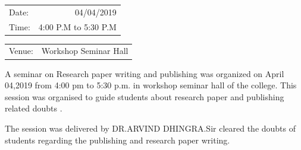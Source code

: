\documentclass[12pt, a4 paper]{article}
\begin{document}
\begin{center}
\begin{multicols}{2}
\begin{tabular}{l r}
Date: & 04/04/2019\\ %
Time: & 4:00 P.M to 5:30 P.M \\ %
\end{tabular}
\columnbreak
\begin{tabular}{l r}
Venue: & Workshop Seminar Hall \\ %
\end{tabular}
\end{multicols}

\begin{Large}
A seminar on Research paper writing and publishing was organized on April 04,2019 from 4:00 pm to 5:30 p.m. in workshop seminar hall of the college. This session was organised to guide students about research paper and publishing related doubts .



 The session was delivered by DR.ARVIND DHINGRA.Sir cleared the doubts of students regarding the publishing and  research paper writing. 

\newpage 


\end{Large}
\end{center}
\end{document}
